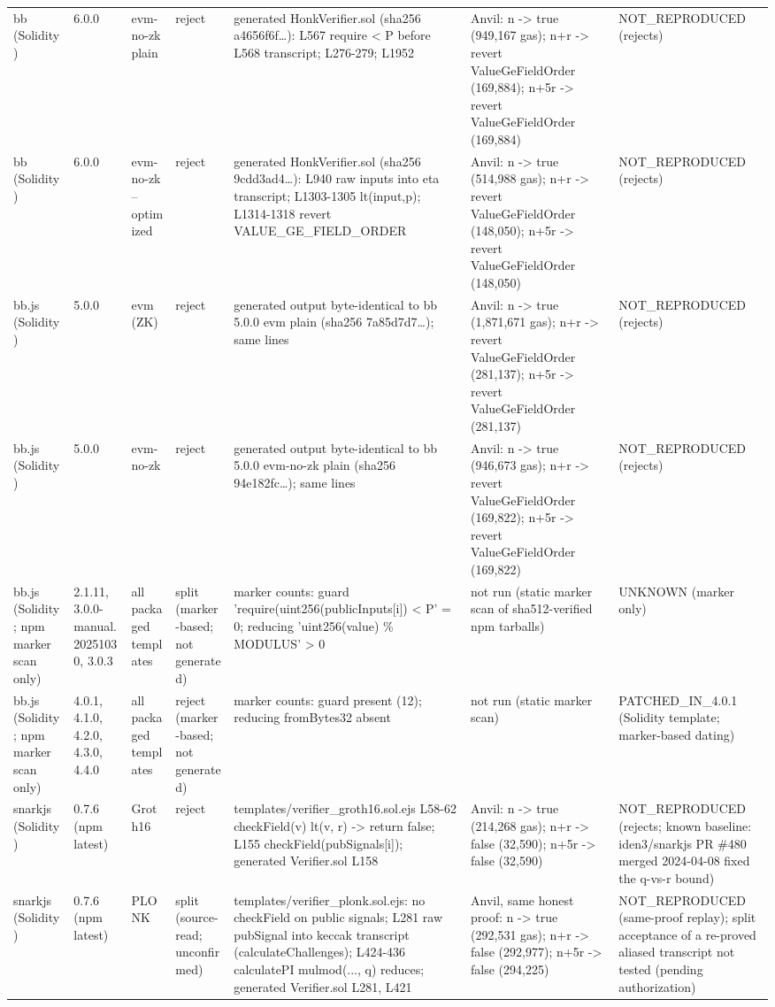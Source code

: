 \begin{tabular}{lllllll}
bb (Solidity) & 6.0.0 & evm-no-zk plain & reject & generated HonkVerifier.sol (sha256 a4656f6f…): L567 require < P before L568 transcript; L276-279; L1952 & Anvil: n -> true (949,167 gas); n+r -> revert ValueGeFieldOrder (169,884); n+5r -> revert ValueGeFieldOrder (169,884) & NOT\_REPRODUCED (rejects) \\
bb (Solidity) & 6.0.0 & evm-no-zk --optimized & reject & generated HonkVerifier.sol (sha256 9cdd3ad4…): L940 raw inputs into eta transcript; L1303-1305 lt(input,p); L1314-1318 revert VALUE\_GE\_FIELD\_ORDER & Anvil: n -> true (514,988 gas); n+r -> revert ValueGeFieldOrder (148,050); n+5r -> revert ValueGeFieldOrder (148,050) & NOT\_REPRODUCED (rejects) \\
bb.js (Solidity) & 5.0.0 & evm (ZK) & reject & generated output byte-identical to bb 5.0.0 evm plain (sha256 7a85d7d7…); same lines & Anvil: n -> true (1,871,671 gas); n+r -> revert ValueGeFieldOrder (281,137); n+5r -> revert ValueGeFieldOrder (281,137) & NOT\_REPRODUCED (rejects) \\
bb.js (Solidity) & 5.0.0 & evm-no-zk & reject & generated output byte-identical to bb 5.0.0 evm-no-zk plain (sha256 94e182fc…); same lines & Anvil: n -> true (946,673 gas); n+r -> revert ValueGeFieldOrder (169,822); n+5r -> revert ValueGeFieldOrder (169,822) & NOT\_REPRODUCED (rejects) \\
bb.js (Solidity; npm marker scan only) & 2.1.11, 3.0.0-manual.20251030, 3.0.3 & all packaged templates & split (marker-based; not generated) & marker counts: guard 'require(uint256(publicInputs[i]) < P' = 0; reducing 'uint256(value) \% MODULUS' > 0 & not run (static marker scan of sha512-verified npm tarballs) & UNKNOWN (marker only) \\
bb.js (Solidity; npm marker scan only) & 4.0.1, 4.1.0, 4.2.0, 4.3.0, 4.4.0 & all packaged templates & reject (marker-based; not generated) & marker counts: guard present (12); reducing fromBytes32 absent & not run (static marker scan) & PATCHED\_IN\_4.0.1 (Solidity template; marker-based dating) \\
snarkjs (Solidity) & 0.7.6 (npm latest) & Groth16 & reject & templates/verifier\_groth16.sol.ejs L58-62 checkField(v) lt(v, r) -> return false; L155 checkField(pubSignals[i]); generated Verifier.sol L158 & Anvil: n -> true (214,268 gas); n+r -> false (32,590); n+5r -> false (32,590) & NOT\_REPRODUCED (rejects; known baseline: iden3/snarkjs PR \#480 merged 2024-04-08 fixed the q-vs-r bound) \\
snarkjs (Solidity) & 0.7.6 (npm latest) & PLONK & split (source-read; unconfirmed) & templates/verifier\_plonk.sol.ejs: no checkField on public signals; L281 raw pubSignal into keccak transcript (calculateChallenges); L424-436 calculatePI mulmod(..., q) reduces; generated Verifier.sol L281, L421 & Anvil, same honest proof: n -> true (292,531 gas); n+r -> false (292,977); n+5r -> false (294,225) & NOT\_REPRODUCED (same-proof replay); split acceptance of a re-proved aliased transcript not tested (pending authorization) \\

\end{tabular}
